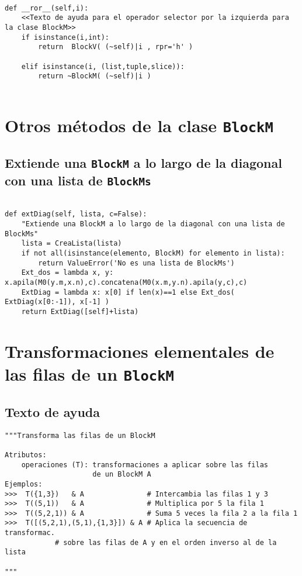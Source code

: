 \documentclass[11pt]{report}
\begin{document}
\begin{verbatim}

def __ror__(self,i):
    <<Texto de ayuda para el operador selector por la izquierda para la clase BlockM>>
    if isinstance(i,int):
        return  BlockV( (~self)|i , rpr='h' )

    elif isinstance(i, (list,tuple,slice)):        
        return ~BlockM( (~self)|i ) 
        
\end{verbatim}

\section{Otros métodos de la clase \texttt{BlockM}}
\label{sec:org1e037cf}
\subsection{Extiende una \texttt{BlockM} a lo largo de la diagonal con una lista de \texttt{BlockMs}}
\label{sec:orgf0e9917}

\begin{verbatim}
   
def extDiag(self, lista, c=False):
    "Extiende una BlockM a lo largo de la diagonal con una lista de BlockMs"
    lista = CreaLista(lista)
    if not all(isinstance(elemento, BlockM) for elemento in lista): 
        return ValueError('No es una lista de BlockMs')
    Ext_dos = lambda x, y: x.apila(M0(y.m,x.n),c).concatena(M0(x.m,y.n).apila(y,c),c)
    ExtDiag = lambda x: x[0] if len(x)==1 else Ext_dos( ExtDiag(x[0:-1]), x[-1] )
    return ExtDiag([self]+lista)

\end{verbatim}

\section{Transformaciones elementales de las filas de un \texttt{BlockM}}
\label{sec:orgd3275e5}

\subsection{Texto de ayuda}
\label{sec:org9d62042}

\begin{verbatim}
"""Transforma las filas de un BlockM

Atributos:
    operaciones (T): transformaciones a aplicar sobre las filas
                     de un BlockM A
Ejemplos:
>>>  T({1,3})   & A               # Intercambia las filas 1 y 3
>>>  T((5,1))   & A               # Multiplica por 5 la fila 1
>>>  T((5,2,1)) & A               # Suma 5 veces la fila 2 a la fila 1
>>>  T([(5,2,1),(5,1),{1,3}]) & A # Aplica la secuencia de transformac.
            # sobre las filas de A y en el orden inverso al de la lista

"""
\end{verbatim}
\end{document}
